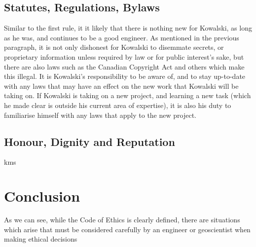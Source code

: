 \documentclass[letterpaper,12pt]{article}
\begin{document}
\subsection{Statutes, Regulations, Bylaws}
Similar to the first rule, it it likely that there is nothing new for Kowalski, as long as he was, and continues to be a good engineer.
As mentioned in the previous paragraph, it is not only dishonest for Kowalski to disemmate secrets, or proprietary information unless required
by law or for public interest's sake, but there are also laws such as the Canadian Copyright Act and others which make this illegal. It is
Kowalski's responsibility to be aware of, and to stay up-to-date with any laws that may have an effect on the new work that Kowalski will be taking on.
If Kowalski is taking on a new project, and learning a new task (which he made clear is outside his current area of expertise), it is also his duty to
familiarise himself with any laws that apply to the new project.

\subsection{Honour, Dignity and Reputation}
kms

\section{Conclusion}
As we can see, while the Code of Ethics is clearly defined, there are situations which arise that must be considered carefully by an engineer or
geoscientist when making ethical decisions


\singlespacing
\nocite{*}
\printbibliography
\end{document}
